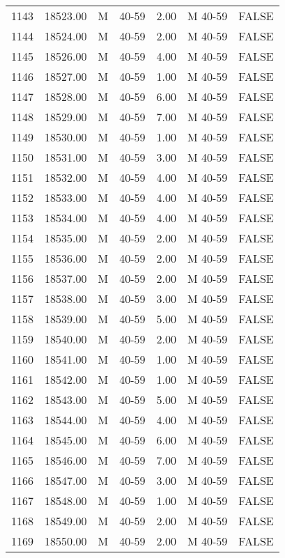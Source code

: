 \begin{table}[ht]
\begin{tabular}{rrllrll}
  1143 & 18523.00 & M & 40-59 & 2.00 & M 40-59 & FALSE \\ 
  1144 & 18524.00 & M & 40-59 & 2.00 & M 40-59 & FALSE \\ 
  1145 & 18526.00 & M & 40-59 & 4.00 & M 40-59 & FALSE \\ 
  1146 & 18527.00 & M & 40-59 & 1.00 & M 40-59 & FALSE \\ 
  1147 & 18528.00 & M & 40-59 & 6.00 & M 40-59 & FALSE \\ 
  1148 & 18529.00 & M & 40-59 & 7.00 & M 40-59 & FALSE \\ 
  1149 & 18530.00 & M & 40-59 & 1.00 & M 40-59 & FALSE \\ 
  1150 & 18531.00 & M & 40-59 & 3.00 & M 40-59 & FALSE \\ 
  1151 & 18532.00 & M & 40-59 & 4.00 & M 40-59 & FALSE \\ 
  1152 & 18533.00 & M & 40-59 & 4.00 & M 40-59 & FALSE \\ 
  1153 & 18534.00 & M & 40-59 & 4.00 & M 40-59 & FALSE \\ 
  1154 & 18535.00 & M & 40-59 & 2.00 & M 40-59 & FALSE \\ 
  1155 & 18536.00 & M & 40-59 & 2.00 & M 40-59 & FALSE \\ 
  1156 & 18537.00 & M & 40-59 & 2.00 & M 40-59 & FALSE \\ 
  1157 & 18538.00 & M & 40-59 & 3.00 & M 40-59 & FALSE \\ 
  1158 & 18539.00 & M & 40-59 & 5.00 & M 40-59 & FALSE \\ 
  1159 & 18540.00 & M & 40-59 & 2.00 & M 40-59 & FALSE \\ 
  1160 & 18541.00 & M & 40-59 & 1.00 & M 40-59 & FALSE \\ 
  1161 & 18542.00 & M & 40-59 & 1.00 & M 40-59 & FALSE \\ 
  1162 & 18543.00 & M & 40-59 & 5.00 & M 40-59 & FALSE \\ 
  1163 & 18544.00 & M & 40-59 & 4.00 & M 40-59 & FALSE \\ 
  1164 & 18545.00 & M & 40-59 & 6.00 & M 40-59 & FALSE \\ 
  1165 & 18546.00 & M & 40-59 & 7.00 & M 40-59 & FALSE \\ 
  1166 & 18547.00 & M & 40-59 & 3.00 & M 40-59 & FALSE \\ 
  1167 & 18548.00 & M & 40-59 & 1.00 & M 40-59 & FALSE \\ 
  1168 & 18549.00 & M & 40-59 & 2.00 & M 40-59 & FALSE \\ 
  1169 & 18550.00 & M & 40-59 & 2.00 & M 40-59 & FALSE \\ 

\end{tabular}
\end{table}
